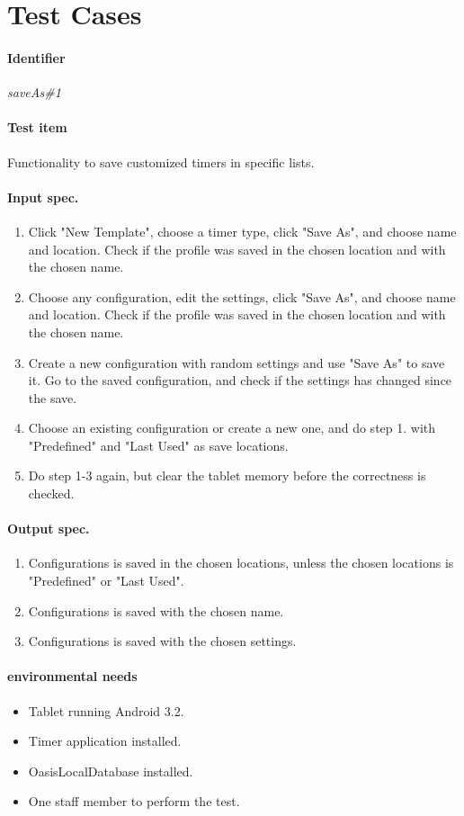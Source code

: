 \section{Test Cases}
\label{sec:test_cases}
\paragraph{Identifier}
	\textit{saveAs\#1}
\paragraph{Test item}
	Functionality to save customized timers in specific lists.
\paragraph{Input spec.}
	\begin{enumerate}
		\item Click "New Template", choose a timer type, click "Save As", and choose name and location. Check if the profile was saved in the chosen location and with the chosen name.
		\item Choose any configuration, edit the settings, click "Save As", and choose name and location. Check if the profile was saved in the chosen location and with the chosen name.
		\item Create a new configuration with random settings and use "Save As" to save it. Go to the saved configuration, and check if the settings has changed since the save.
		\item Choose an existing configuration or create a new one, and do step 1. with "Predefined" and "Last Used" as save locations.
		\item Do step 1-3 again, but clear the tablet memory before the correctness is checked.
	\end{enumerate}
\paragraph{Output spec.}
	\begin{enumerate}
		\item Configurations is saved in the chosen locations, unless the chosen locations is "Predefined" or "Last Used".
		\item Configurations is saved with the chosen name.
		\item Configurations is saved with the chosen settings.
	\end{enumerate}
\paragraph{environmental needs}
	\begin{itemize}
		\item Tablet running Android 3.2.
		\item Timer application installed.
		\item OasisLocalDatabase installed.
		\item One staff member to perform the test.
	\end{itemize}

